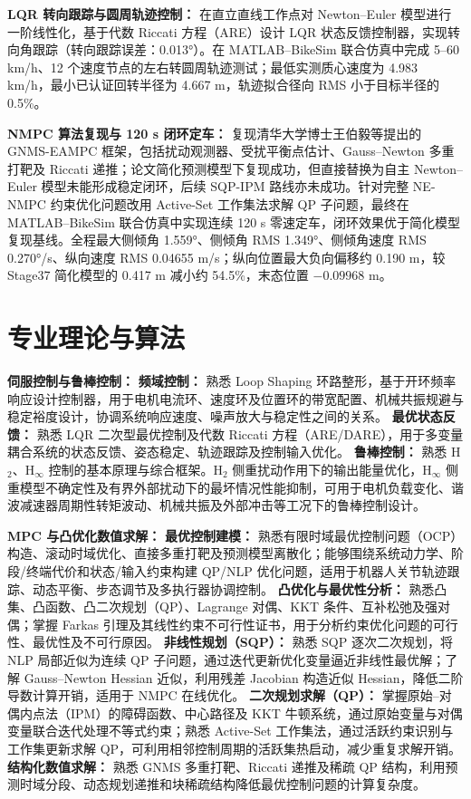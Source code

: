\documentclass[10pt,a4paper]{article}
\newcommand{\cvsection}[2]{%
  \section{\texorpdfstring{\makebox[\widthof{#1}][c]{\color{CVBlue}#1}\hspace{0.35em}#2}{#2}}%
}
\newcommand{\resumepara}[2]{%
  \noindent\textbf{#1：}#2\par\vspace{0.16em}%
}
\begin{document}
\resumepara{LQR 转向跟踪与圆周轨迹控制}{
在直立直线工作点对 Newton--Euler 模型进行一阶线性化，基于代数 Riccati 方程（ARE）设计 LQR 状态反馈控制器，实现转向角跟踪（转向跟踪误差：0.013°）。在 MATLAB--BikeSim 联合仿真中完成 5--60 km/h、12 个速度节点的左右转圆周轨迹测试；最低实测质心速度为 4.983 km/h，最小已认证回转半径为 4.667 m，轨迹拟合径向 RMS 小于目标半径的 0.5\%。
}

\resumepara{NMPC 算法复现与 120 s 闭环定车}{
复现清华大学博士王伯毅等提出的 GNMS-EAMPC 框架，包括扰动观测器、受扰平衡点估计、Gauss--Newton 多重打靶及 Riccati 递推；论文简化预测模型下复现成功，但直接替换为自主 Newton--Euler 模型未能形成稳定闭环，后续 SQP-IPM 路线亦未成功。针对完整 NE-NMPC 约束优化问题改用 Active-Set 工作集法求解 QP 子问题，最终在 MATLAB--BikeSim 联合仿真中实现连续 120 s 零速定车，闭环效果优于简化模型复现基线。全程最大侧倾角 1.559°、侧倾角 RMS 1.349°、侧倾角速度 RMS 0.270°/s、纵向速度 RMS 0.04655 m/s；纵向位置最大负向偏移约 0.190 m，较 Stage37 简化模型的 0.417 m 减小约 54.5\%，末态位置 $-0.09968$ m。
}

\cvsection{\faCogs}{专业理论与算法}

\resumepara{伺服控制与鲁棒控制}{
\textbf{频域控制：} 熟悉 Loop Shaping 环路整形，基于开环频率响应设计控制器，用于电机电流环、速度环及位置环的带宽配置、机械共振规避与稳定裕度设计，协调系统响应速度、噪声放大与稳定性之间的关系。
\textbf{最优状态反馈：} 熟悉 LQR 二次型最优控制及代数 Riccati 方程（ARE/DARE），用于多变量耦合系统的状态反馈、姿态稳定、轨迹跟踪及控制输入优化。
\textbf{鲁棒控制：} 熟悉 H$_2$、H$_\infty$ 控制的基本原理与综合框架。H$_2$ 侧重扰动作用下的输出能量优化，H$_\infty$ 侧重模型不确定性及有界外部扰动下的最坏情况性能抑制，可用于电机负载变化、谐波减速器周期性转矩波动、机械共振及外部冲击等工况下的鲁棒控制设计。
}

\resumepara{MPC 与凸优化数值求解}{
\textbf{最优控制建模：} 熟悉有限时域最优控制问题（OCP）构造、滚动时域优化、直接多重打靶及预测模型离散化；能够围绕系统动力学、阶段/终端代价和状态/输入约束构建 QP/NLP 优化问题，适用于机器人关节轨迹跟踪、动态平衡、步态调节及多执行器协调控制。
\textbf{凸优化与最优性分析：} 熟悉凸集、凸函数、凸二次规划（QP）、Lagrange 对偶、KKT 条件、互补松弛及强对偶；掌握 Farkas 引理及其线性约束不可行性证书，用于分析约束优化问题的可行性、最优性及不可行原因。
\textbf{非线性规划（SQP）：} 熟悉 SQP 逐次二次规划，将 NLP 局部近似为连续 QP 子问题，通过迭代更新优化变量逼近非线性最优解；了解 Gauss--Newton Hessian 近似，利用残差 Jacobian 构造近似 Hessian，降低二阶导数计算开销，适用于 NMPC 在线优化。
\textbf{二次规划求解（QP）：} 掌握原始--对偶内点法（IPM）的障碍函数、中心路径及 KKT 牛顿系统，通过原始变量与对偶变量联合迭代处理不等式约束；熟悉 Active-Set 工作集法，通过活跃约束识别与工作集更新求解 QP，可利用相邻控制周期的活跃集热启动，减少重复求解开销。
\textbf{结构化数值求解：} 熟悉 GNMS 多重打靶、Riccati 递推及稀疏 QP 结构，利用预测时域分段、动态规划递推和块稀疏结构降低最优控制问题的计算复杂度。
}
\end{document}
